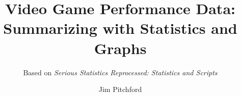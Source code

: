 \documentclass[aspectratio=43, 10.5pt, t]{beamer}
\title{Video Game Performance Data:\newline
Summarizing with Statistics and Graphs}
\author{Jim Pitchford}
\subtitle{\footnotesize	Based on \textit{Serious Statistics Reprocessed: Statistics and Scripts}}
\begin{document}
\graphicspath{{Media/}}

\begin{frame}
	\maketitle
\end{frame}














\end{document}
